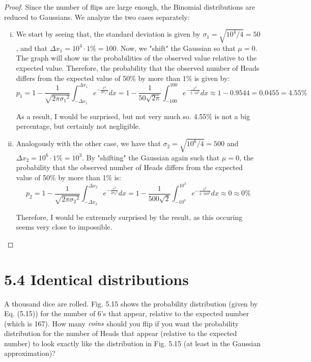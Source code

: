 \begin{proof}
    Since the number of flips are large enough, the Binomial distributions are reduced
    to Gaussians. We analyze the two cases separately:
    \begin{enumerate}[(i)]
        \item We start by seeing that, the standard deviation is given by $\sigma_1 = \sqrt{10^4 / 4} = 50$, and
            that $\Delta x_1 = 10^4 \cdot 1\% = 100$. Now, we "shift" the Gaussian so that
            $\mu = 0$. The graph will show us the probabilities of the observed
            value relative to the expected value. Therefore, the probability
            that the observed number of Heads differs from the expected value of
            50\% by more than 1\% is given by:
            \[
                p_1 
                = 1 - \frac{1}{\sqrt{2 \pi {\sigma_1}^2}} 
                    \int_{-\Delta x_1}^{\Delta x_1} e^{-\frac{x^2}{2{\sigma_1}^2}} dx
                = 1 - \frac{1}{50\sqrt{2\pi}} 
                    \int_{-100}^{100} e^{-\frac{x^2}{2 \cdot 50^2}} dx
                \approx 1 - 0.9544 = 0.0455 = 4.55\%
            \] 

        As a result, I would be surprised, but not very much so. 4.55\% is not a big percentage, but 
        certainly not negligible.

    \item Analogously with the other case, we have that $\sigma_2 = \sqrt{10^6/4} = 500$ and 
        $\Delta x_2 = 10^6 \cdot 1\% = 10^3$. By "shifting" the Gaussian again such that
        $\mu = 0$, the probability that the observed number of Heads differs from
        the expected value of 50\% by more than 1\% is:
        \[
            p_2 
            = 1 - \frac{1}{\sqrt{2 \pi {\sigma_2}^2}} 
                \int_{-\Delta x_2}^{\Delta x_2} e^{-\frac{x^2}{2{\sigma_2}^2}} dx
            = 1 - \frac{1}{500\sqrt{2}} 
                \int_{-10^3}^{10^3} e^{-\frac{x^2}{2 \cdot 500^2}} dx
            \approx 0 \approx 0\%
        \] 

        Therefore, I would be extremely surprised by the result, as this occuring seems 
        very close to impossible.
    \end{enumerate}
\end{proof}

\section*{5.4 Identical distributions}
A thousand dice are rolled. Fig. 5.15 shows the probability distribution (given
by Eq. (5.15)) for the number of 6's that appear, relative to the expected number
(which is 167). How many $\emph{coins}$ should you flip if you want the probability
distribution for the number of Heads that appear (relative to the expected number)
to look exactly like the distribution in Fig. 5.15 (at least in the Gaussian
approximation)?

